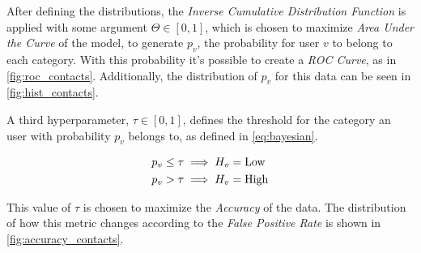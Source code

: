 After defining the distributions, the \emph{Inverse Cumulative Distribution Function} is applied with some argument $\Theta \in \left[ 0, 1 \right]$, which is chosen to maximize \emph{Area Under the Curve} of the model, to generate $p_v$, the probability for user $v$ to belong to each category. With this probability it's possible to create a \emph{ROC Curve}, as in \cref{fig:roc_contacts}. Additionally, the distribution of $p_v$ for this data can be seen in \cref{fig:hist_contacts}.

A third hyperparameter, $\tau \in \left[ 0, 1 \right]$, defines the threshold for the category an user with probability $p_v$ belongs to, as defined in \cref{eq:bayesian}.

\begin{equation}
\label{eq:bayesian}
\begin{aligned}
	p_v \leq \tau &\implies H_v = \operatorname{Low} \\
	p_v > \tau &\implies H_v = \operatorname{High}
\end{aligned}
\end{equation}

This value of $\tau$ is chosen to maximize the \emph{Accuracy} of the data. The distribution of how this metric changes according to the \emph{False Positive Rate} is shown in \cref{fig:accuracy_contacts}.

